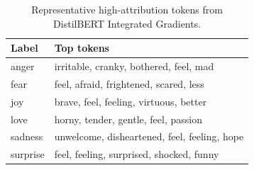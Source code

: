 \begin{table}
\caption{Representative high-attribution tokens from DistilBERT Integrated Gradients.}
\label{tab:distilbert-integrated-gradients}
\begin{tabular}{ll}
\toprule
Label & Top tokens \\
\midrule
anger & irritable, cranky, bothered, feel, mad \\
fear & feel, afraid, frightened, scared, less \\
joy & brave, feel, feeling, virtuous, better \\
love & horny, tender, gentle, feel, passion \\
sadness & unwelcome, disheartened, feel, feeling, hope \\
surprise & feel, feeling, surprised, shocked, funny \\
\bottomrule
\end{tabular}
\end{table}
